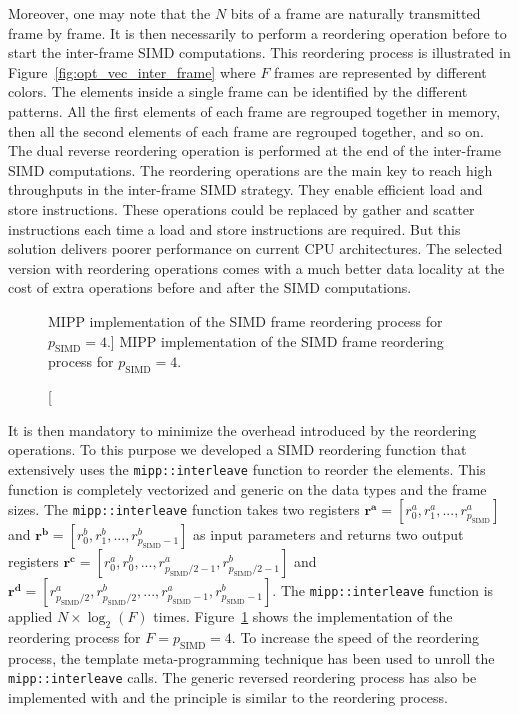 Moreover, one may note that the $N$ bits of a frame are naturally transmitted
frame by frame. It is then necessarily to perform a reordering operation before
to start the inter-frame SIMD computations. This reordering process is
illustrated in Figure~\ref{fig:opt_vec_inter_frame} where $F$ frames are
represented by different colors. The elements inside a single frame can be
identified by the different patterns. All the first elements of each frame are
regrouped together in memory, then all the second elements of each frame are
regrouped together, and so on. The dual reverse reordering operation is
performed at the end of the inter-frame SIMD computations. The reordering
operations are the main key to reach high throughputs in the inter-frame SIMD
strategy. They enable efficient load and store instructions. These operations
could be replaced by gather and scatter instructions each time a load and store
instructions are required. But this solution delivers poorer performance on
current CPU architectures. The selected version with reordering operations comes
with a much better data locality at the cost of extra operations before and
after the SIMD computations.

\begin{figure}[htp]
  \centering
  \caption
    [MIPP implementation of the SIMD frame reordering process for
     $p_\text{SIMD} = 4$.]
    {MIPP implementation of the SIMD frame reordering process for
     $p_\text{SIMD} = 4$.}
  \label{fig:opt_vec_reordering}
\end{figure}

It is then mandatory to minimize the overhead introduced by the reordering
operations. To this purpose we developed a SIMD reordering function that
extensively uses the \verb|mipp::interleave| function to reorder the elements.
This function is completely vectorized and generic on the data types and the
frame sizes. The \verb|mipp::interleave| function takes two registers $\bm{r^a}
= [r^a_0, r^a_1, ..., r^a_{p_\text{SIMD}}]$ and $\bm{r^b} = [r^b_0, r^b_1,
..., r^b_{p_\text{SIMD}-1}]$ as input parameters and returns two output
registers $\bm{r^c} = [r^a_0, r^b_0, ..., r^a_{p_\text{SIMD}/2-1},
r^b_{p_\text{SIMD}/2-1}]$ and $\bm{r^d} = [r^a_{p_\text{SIMD}/2},
r^b_{p_\text{SIMD}/2}, ..., r^a_{p_\text{SIMD}-1}, r^b_{p_\text{SIMD}-1}]$.
The \verb|mipp::interleave| function is applied $N \times \log_2(F)$ times.
Figure~\ref{fig:opt_vec_reordering} shows the \MIPP implementation of the
reordering process for $F = p_\text{SIMD} = 4$. To increase the speed of the
reordering process, the template meta-programming technique has been used to
unroll the \verb|mipp::interleave| calls. The generic reversed reordering
process has also be implemented with \MIPP and the principle is similar to the
reordering process.

